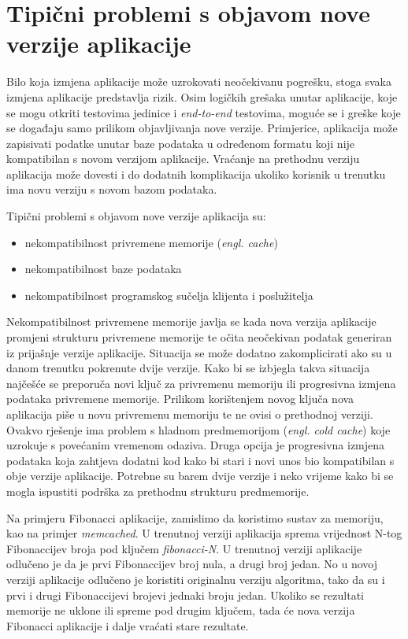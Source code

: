 \section{Tipični problemi s objavom nove verzije aplikacije}
Bilo koja izmjena aplikacije može uzrokovati neočekivanu pogrešku, stoga svaka izmjena aplikacije
predstavlja rizik. Osim logičkih grešaka unutar aplikacije, koje se mogu otkriti testovima jedinice
i \textit{end-to-end} testovima, moguće se i greške koje se događaju samo prilikom objavljivanja
nove verzije. Primjerice, aplikacija može zapisivati podatke unutar baze podataka u određenom
formatu koji nije kompatibilan s novom verzijom aplikacije. Vraćanje na prethodnu verziju aplikacija
može dovesti i do dodatnih komplikacija ukoliko korisnik u trenutku ima novu verziju s novom bazom
podataka.

Tipični problemi s objavom nove verzije aplikacija su:
\begin{itemize}
    \item nekompatibilnost privremene memorije (\textit{engl. cache})
    \item nekompatibilnost baze podataka
    \item nekompatibilnost programskog sučelja klijenta i poslužitelja
\end{itemize}

Nekompatibilnost privremene memorije javlja se kada nova verzija aplikacije promjeni strukturu
privremene memorije te očita neočekivan podatak generiran iz prijašnje verzije aplikacije. Situacija
se može dodatno zakomplicirati ako su u danom trenutku pokrenute dvije verzije. Kako bi se izbjegla
takva situacija najčešće se preporuča novi ključ za privremenu memoriju ili progresivna izmjena
podataka privremene memorije. Prilikom korištenjem novog ključa nova aplikacija piše u novu
privremenu memoriju te ne ovisi o prethodnoj verziji. Ovakvo rješenje ima problem s hladnom
predmemorijom (\textit{engl. cold cache}) koje uzrokuje s povećanim vremenom odaziva. Druga opcija
je progresivna izmjena podataka koja zahtjeva dodatni kod kako bi stari i novi unos bio kompatibilan
s obje verzije aplikacije. Potrebne su barem dvije verzije i neko vrijeme kako bi se mogla ispustiti
podrška za prethodnu strukturu predmemorije.

Na primjeru Fibonacci aplikacije, zamislimo da koristimo sustav za memoriju, kao na primjer
\textit{memcached}. U trenutnoj verziji aplikacija sprema vrijednost N-tog Fibonaccijev broja pod
ključem \textit{fibonacci-N}. U trenutnoj verziji aplikacije odlučeno je da je prvi Fibonaccijev
broj nula, a drugi broj jedan. No u novoj verziji aplikacije odlučeno je koristiti originalnu
verziju algoritma, tako da su i prvi i drugi Fibonaccijevi brojevi jednaki broju jedan. Ukoliko se
rezultati memorije ne uklone ili spreme pod drugim ključem, tada će nova verzija Fibonacci
aplikacije i dalje vraćati stare rezultate.

